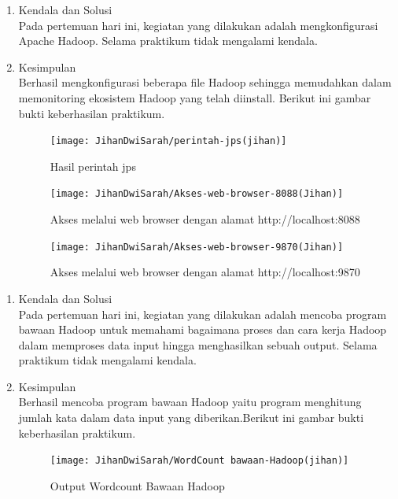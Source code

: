 \begin{enumerate}
\item Kendala dan Solusi \\
Pada pertemuan hari ini, kegiatan yang dilakukan adalah mengkonfigurasi Apache Hadoop. Selama praktikum tidak mengalami kendala.

\item Kesimpulan \\
Berhasil mengkonfigurasi beberapa file Hadoop sehingga memudahkan dalam memonitoring ekosistem Hadoop yang telah diinstall. Berikut ini gambar bukti keberhasilan praktikum. 

\begin{figure}[!ht]
\texttt{[image: JihanDwiSarah/perintah-jps(jihan)]}
\caption{Hasil perintah jps}
\label{gam:perintah-jps(jihan)}
\end{figure} 


\begin{figure}[!ht]
\texttt{[image: JihanDwiSarah/Akses-web-browser-8088(Jihan)]}
\caption{Akses melalui web browser dengan alamat http://localhost:8088}
\label{gam:Akses-web-browser-8088(Jihan)}
\end{figure} 

\begin{figure}[!ht]
\texttt{[image: JihanDwiSarah/Akses-web-browser-9870(Jihan)]}
\caption{Akses melalui web browser dengan alamat http://localhost:9870}
\label{gam:Akses-web-browser-9870(Jihan)}
\end{figure} 
\end{enumerate}

\begin{enumerate}
\item Kendala dan Solusi \\
Pada pertemuan hari ini, kegiatan yang dilakukan adalah mencoba program bawaan Hadoop untuk memahami bagaimana
proses dan cara kerja Hadoop dalam memproses data input hingga menghasilkan sebuah output. Selama praktikum tidak mengalami kendala.

\item Kesimpulan\\
Berhasil mencoba program bawaan Hadoop yaitu program menghitung jumlah kata dalam data input yang diberikan.Berikut ini gambar bukti keberhasilan praktikum. 
\begin{figure}[!ht]
\texttt{[image: JihanDwiSarah/WordCount bawaan-Hadoop(jihan)]}
\caption{Output Wordcount Bawaan Hadoop}
\label{gam:WordCount bawaan-Hadoop(jihan)}
\end{figure}
\end{enumerate}

